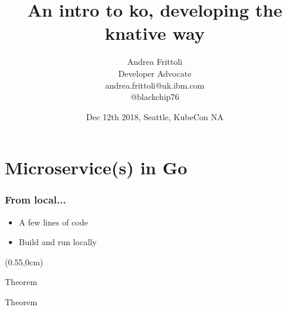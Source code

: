 \documentclass[aspectratio=169,11pt,hyperref={colorlinks=true}]{beamer}
\title{An intro to ko, developing the knative way}
\date[KubeCon NA]{Dec 12th 2018, Seattle, KubeCon NA}
\author[Andrea]{
  Andrea Frittoli \\
  Developer Advocate \\
  andrea.frittoli@uk.ibm.com \\
  @blackchip76
}
\begin{document}
\begin{frame}[noframenumbering]
\titlepage{}
\end{frame}

\section{Microservice(s) in Go}

\begin{lgrayrwhiteframe}
  \frametitle{From local...}
  \large
  \begin{itemize}
    \item A few lines of code
    \item Build and run locally
  \end{itemize}
  \begin{textblock*}{0.4\paperwidth}(0.55\paperwidth,0cm)
    \begin{beamercolorbox}[leftskip=1cm,rightskip=1cm,rounded=true,sep=2.5ex]{Theorem}
        
    \end{beamercolorbox}
    \begin{beamercolorbox}[leftskip=1cm,rightskip=1cm,rounded=true]{Theorem}
        
    \end{beamercolorbox}
  \end{textblock*}
\end{lgrayrwhiteframe}
\end{document}
